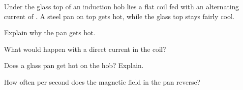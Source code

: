 Under the glass top of an induction hob lies a flat coil fed with an alternating current of \fO. A steel pan on top gets hot, while the glass top stays fairly cool.

\begin{abcliste}
\abc Explain why the pan gets hot.

\abc What would happen with a direct current in the coil?

\abc Does a glass pan get hot on the hob? Explain.

\abc How often per second does the magnetic field in the pan reverse?
\end{abcliste}
